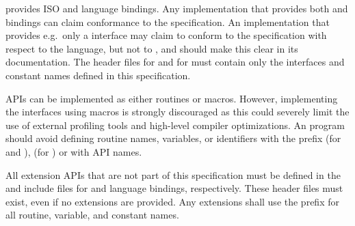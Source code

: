 \openshmem provides ISO \Cstd and \Fortran[90] language bindings.
Any implementation that provides both \Cstd and \Fortran bindings can claim
conformance to the specification. An implementation that provides e.g.\ only a
\Cstd interface may claim to conform to the \openshmem specification with
respect to the \Cstd language, but not to \Fortran, and should make this
clear in its documentation. The \openshmem header files  for
\Cstd and  for
\Fortran must contain only the interfaces and constant names defined in this
specification.

\openshmem \acp{API} can be implemented as either routines or macros. However,
implementing the interfaces using macros is strongly discouraged as this could
severely limit the use of external profiling tools and high-level compiler
optimizations. An \openshmem program should avoid defining routine names,
variables, or identifiers with the prefix \shmemprefix (for \Cstd and
\Fortran), \shmemprefixC (for \Cstd) or with \openshmem \ac{API} names.

All \openshmem extension \acp{API} that are not part of this specification must
be defined in the  and  include files for
\Cstd and \Fortran language bindings, respectively.  These header files
must exist, even if no extensions are provided.  Any extensions shall use the
 prefix for all routine, variable, and constant names.
